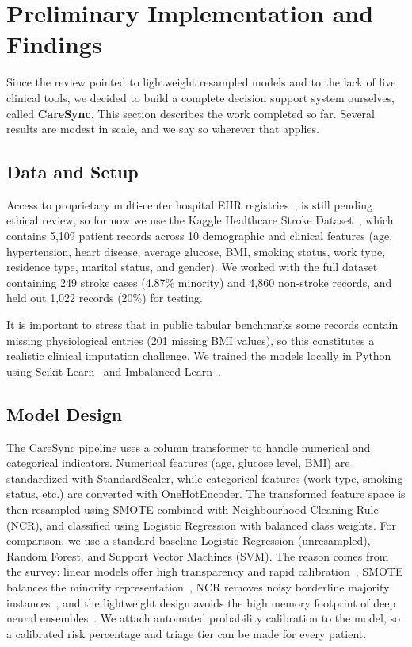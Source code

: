\documentclass[10pt,journal,compsoc]{IEEEtran}
\begin{document}
\section{Preliminary Implementation and Findings}
\label{sec:implementation}
Since the review pointed to lightweight resampled models and to the lack of live clinical tools, we decided to build a complete decision support system ourselves, called \textbf{CareSync}. This section describes the work completed so far. Several results are modest in scale, and we say so wherever that applies.

\subsection{Data and Setup}
Access to proprietary multi-center hospital EHR registries~\cite{who2024}, \cite{aha2024} is still pending ethical review, so for now we use the Kaggle Healthcare Stroke Dataset~\cite{kaggleStroke}, which contains 5,109 patient records across 10 demographic and clinical features (age, hypertension, heart disease, average glucose, BMI, smoking status, work type, residence type, marital status, and gender). We worked with the full dataset containing 249 stroke cases (4.87\% minority) and 4,860 non-stroke records, and held out 1,022 records (20\%) for testing.

It is important to stress that in public tabular benchmarks some records contain missing physiological entries (201 missing BMI values), so this constitutes a realistic clinical imputation challenge. We trained the models locally in Python using Scikit-Learn~\cite{pedregosa2011} and Imbalanced-Learn~\cite{lemaitre2017}.

\subsection{Model Design}
The CareSync pipeline uses a column transformer to handle numerical and categorical indicators. Numerical features (age, glucose level, BMI) are standardized with StandardScaler, while categorical features (work type, smoking status, etc.) are converted with OneHotEncoder. The transformed feature space is then resampled using SMOTE combined with Neighbourhood Cleaning Rule (NCR), and classified using Logistic Regression with balanced class weights. For comparison, we use a standard baseline Logistic Regression (unresampled), Random Forest, and Support Vector Machines (SVM). The reason comes from the survey: linear models offer high transparency and rapid calibration~\cite{kothadiya2023}, SMOTE balances the minority representation~\cite{chawla2002}, NCR removes noisy borderline majority instances~\cite{laurikkala2001}, and the lightweight design avoids the high memory footprint of deep neural ensembles~\cite{treveil2020}. We attach automated probability calibration to the model, so a calibrated risk percentage and triage tier can be made for every patient.
\end{document}
